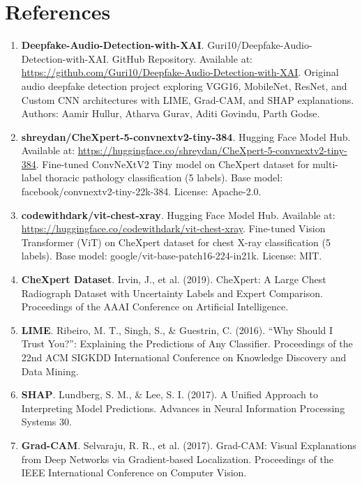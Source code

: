 \documentclass[11pt,a4paper]{article}
\begin{document}
\section*{References}
\begin{enumerate}
\item \textbf{Deepfake-Audio-Detection-with-XAI}. Guri10/Deepfake-Audio-Detection-with-XAI. GitHub Repository. Available at: \url{https://github.com/Guri10/Deepfake-Audio-Detection-with-XAI}. Original audio deepfake detection project exploring VGG16, MobileNet, ResNet, and Custom CNN architectures with LIME, Grad-CAM, and SHAP explanations. Authors: Aamir Hullur, Atharva Gurav, Aditi Govindu, Parth Godse.

\item \textbf{shreydan/CheXpert-5-convnextv2-tiny-384}. Hugging Face Model Hub. Available at: \url{https://huggingface.co/shreydan/CheXpert-5-convnextv2-tiny-384}. Fine-tuned ConvNeXtV2 Tiny model on CheXpert dataset for multi-label thoracic pathology classification (5 labels). Base model: facebook/convnextv2-tiny-22k-384. License: Apache-2.0.

\item \textbf{codewithdark/vit-chest-xray}. Hugging Face Model Hub. Available at: \url{https://huggingface.co/codewithdark/vit-chest-xray}. Fine-tuned Vision Transformer (ViT) on CheXpert dataset for chest X-ray classification (5 labels). Base model: google/vit-base-patch16-224-in21k. License: MIT.

\item \textbf{CheXpert Dataset}. Irvin, J., et al. (2019). CheXpert: A Large Chest Radiograph Dataset with Uncertainty Labels and Expert Comparison. Proceedings of the AAAI Conference on Artificial Intelligence.

\item \textbf{LIME}. Ribeiro, M. T., Singh, S., \& Guestrin, C. (2016). ``Why Should I Trust You?'': Explaining the Predictions of Any Classifier. Proceedings of the 22nd ACM SIGKDD International Conference on Knowledge Discovery and Data Mining.

\item \textbf{SHAP}. Lundberg, S. M., \& Lee, S. I. (2017). A Unified Approach to Interpreting Model Predictions. Advances in Neural Information Processing Systems 30.

\item \textbf{Grad-CAM}. Selvaraju, R. R., et al. (2017). Grad-CAM: Visual Explanations from Deep Networks via Gradient-based Localization. Proceedings of the IEEE International Conference on Computer Vision.
\end{enumerate}
\end{document}
